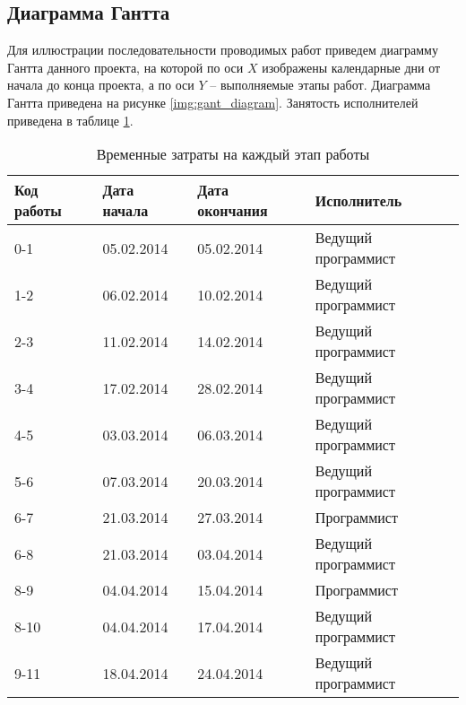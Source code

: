 \subsection{Диаграмма Гантта} \label{gant}

Для иллюстрации последовательности проводимых работ приведем диаграмму Гантта данного проекта, на которой по оси $X$ изображены календарные дни от начала до конца проекта, а по оси $Y$ – выполняемые этапы работ.
Диаграмма Гантта приведена на рисунке \ref{img:gant_diagram}. Занятость исполнителей приведена в таблице \ref{table:workers_dates}.

\begin{table} [h!]
  \centering
  \parbox{15cm}{\caption{Временные затраты на каждый этап работы}\label{table:workers_dates}}
 \begin{center}
  \begin{tabular}{| m{2cm} | m{4cm} | m{4cm} | m{5cm}|}
  \hline
 \rowcolor{Gray} \centering Код работы  &\centering Дата начала &\centering Дата окончания &\centering  Исполнитель \tabularnewline \hline

0-1 & 05.02.2014 & 05.02.2014 & Ведущий программист \tabularnewline \hline
1-2 & 06.02.2014 & 10.02.2014 & Ведущий программист \tabularnewline \hline
2-3 & 11.02.2014 & 14.02.2014 & Ведущий программист \tabularnewline \hline
3-4 & 17.02.2014 & 28.02.2014 & Ведущий программист \tabularnewline \hline
4-5 & 03.03.2014 & 06.03.2014 & Ведущий программист \tabularnewline \hline
5-6 & 07.03.2014 & 20.03.2014 & Ведущий программист \tabularnewline \hline
6-7 & 21.03.2014 & 27.03.2014 & Программист \tabularnewline \hline
6-8 & 21.03.2014 & 03.04.2014 & Ведущий программист \tabularnewline \hline
8-9 & 04.04.2014 & 15.04.2014 & Программист \tabularnewline \hline
8-10 &04.04.2014 & 17.04.2014 & Ведущий программист \tabularnewline \hline
9-11 & 18.04.2014 & 24.04.2014 & Ведущий программист \tabularnewline \hline
   \end{tabular}
 \end{center}
\end{table}